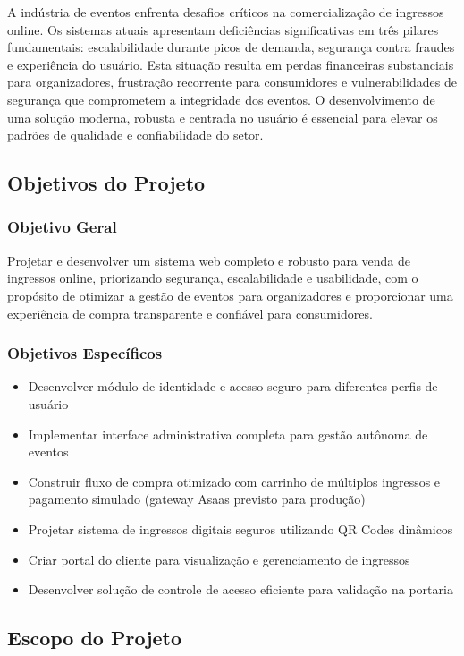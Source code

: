 A indústria de eventos enfrenta desafios críticos na comercialização de ingressos online. Os sistemas atuais apresentam deficiências significativas em três pilares fundamentais: escalabilidade durante picos de demanda, segurança contra fraudes e experiência do usuário. Esta situação resulta em perdas financeiras substanciais para organizadores, frustração recorrente para consumidores e vulnerabilidades de segurança que comprometem a integridade dos eventos. O desenvolvimento de uma solução moderna, robusta e centrada no usuário é essencial para elevar os padrões de qualidade e confiabilidade do setor.

\subsection{Objetivos do Projeto}

\subsubsection{Objetivo Geral}
Projetar e desenvolver um sistema web completo e robusto para venda de ingressos online, priorizando segurança, escalabilidade e usabilidade, com o propósito de otimizar a gestão de eventos para organizadores e proporcionar uma experiência de compra transparente e confiável para consumidores.

\subsubsection{Objetivos Específicos}
\begin{itemize}
    \item Desenvolver módulo de identidade e acesso seguro para diferentes perfis de usuário
    \item Implementar interface administrativa completa para gestão autônoma de eventos
    \item Construir fluxo de compra otimizado com carrinho de múltiplos ingressos e pagamento simulado (gateway Asaas previsto para produção)
    \item Projetar sistema de ingressos digitais seguros utilizando QR Codes dinâmicos
    \item Criar portal do cliente para visualização e gerenciamento de ingressos
    \item Desenvolver solução de controle de acesso eficiente para validação na portaria
\end{itemize}

\subsection{Escopo do Projeto}

